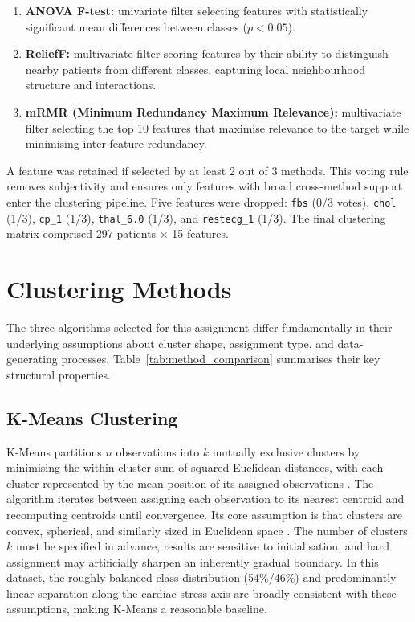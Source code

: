 \documentclass[twocolumn, fontsize=10pt]{article}
\begin{document}
\begin{enumerate}[noitemsep]
    \item \textbf{ANOVA F-test:} univariate filter selecting features with statistically significant mean differences between classes ($p < 0.05$).
    \item \textbf{ReliefF:} multivariate filter scoring features by their ability to distinguish nearby patients from different classes, capturing local neighbourhood structure and interactions.
    \item \textbf{mRMR (Minimum Redundancy Maximum Relevance):} multivariate filter selecting the top 10 features that maximise relevance to the target while minimising inter-feature redundancy.
\end{enumerate}

A feature was retained if selected by  {at least 2 out of 3 methods}. This voting rule removes subjectivity and ensures only features with broad cross-method support enter the clustering pipeline. Five features were dropped:
\texttt{fbs} (0/3 votes), \texttt{chol} (1/3), \texttt{cp\_1} (1/3), \texttt{thal\_6.0} (1/3), and \texttt{restecg\_1} (1/3). The final clustering matrix comprised  {297 patients $\times$ 15 features}.


\section{Clustering Methods}

The three algorithms selected for this assignment differ fundamentally in 
their underlying assumptions about cluster shape, assignment type, and 
data-generating processes. Table~\ref{tab:method_comparison} summarises 
their key structural properties.

\subsection{K-Means Clustering}
K-Means partitions $n$ observations into $k$ mutually exclusive clusters 
by minimising the within-cluster sum of squared Euclidean distances, with 
each cluster represented by the mean position of its assigned observations 
\citep{macqueen1967methods}. The algorithm iterates between assigning each 
observation to its nearest centroid and recomputing centroids until 
convergence. Its core assumption is that clusters are convex, spherical, 
and similarly sized in Euclidean space \citep{bishop2006pattern}. The 
number of clusters $k$ must be specified in advance, results are sensitive 
to initialisation, and hard assignment may artificially sharpen an 
inherently gradual boundary. In this dataset, the roughly balanced class 
distribution (54\%/46\%) and predominantly linear separation along the 
cardiac stress axis are broadly consistent with these assumptions, making 
K-Means a reasonable baseline.
\end{document}
